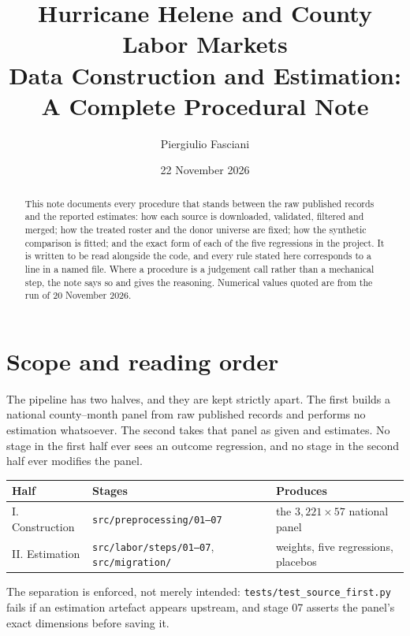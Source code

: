 \documentclass[11pt,a4paper]{article}
\title{\textbf{Hurricane Helene and County Labor Markets}\\[.3em]
\large Data Construction and Estimation: A Complete Procedural Note}
\author{Piergiulio Fasciani}
\date{22 November 2026}
\newcommand{\file}[1]{\texttt{\small #1}}
\begin{document}
\maketitle

\begin{abstract}
\noindent This note documents every procedure that stands between the raw
published records and the reported estimates: how each source is downloaded,
validated, filtered and merged; how the treated roster and the donor universe
are fixed; how the synthetic comparison is fitted; and the exact form of each
of the five regressions in the project. It is written to be read alongside the
code, and every rule stated here corresponds to a line in a named file. Where
a procedure is a judgement call rather than a mechanical step, the note says so
and gives the reasoning. Numerical values quoted are from the run of
20 November 2026.
\end{abstract}

\tableofcontents
\bigskip

\section{Scope and reading order}

The pipeline has two halves, and they are kept strictly apart. The first builds
a national county--month panel from raw published records and performs no
estimation whatsoever. The second takes that panel as given and estimates. No
stage in the first half ever sees an outcome regression, and no stage in the
second half ever modifies the panel.

\begin{center}
\small
\begin{tabular}{@{}lp{5.1cm}p{5.6cm}@{}}
\toprule
\textbf{Half} & \textbf{Stages} & \textbf{Produces} \\
\midrule
I. Construction & \file{src/preprocessing/01--07} & the $3{,}221\times57$ national panel \\
II. Estimation  & \file{src/labor/steps/01--07}, \file{src/migration/} & weights, five regressions, placebos \\
\bottomrule
\end{tabular}
\end{center}

\noindent The separation is enforced, not merely intended: \file{tests/test\_source\_first.py}
fails if an estimation artefact appears upstream, and stage 07 asserts the panel's
exact dimensions before saving it.
\end{document}
